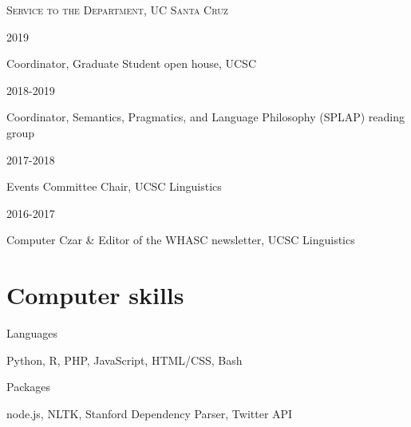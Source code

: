 \documentclass[12pt]{article} %
\begin{document}
\textsc{Service to the Department, UC Santa Cruz}\\



\vspace{0.05cm}

\begin{minipage}[t]{3cm}
2019
\end{minipage}
\begin{minipage}[t]{\smallertextwidth}Coordinator, Graduate Student open house, UCSC\end{minipage}

\begin{minipage}[t]{3cm}
2018-2019
\end{minipage}
\begin{minipage}[t]{\smallertextwidth}Coordinator, Semantics, Pragmatics, and Language Philosophy (SPLAP) reading group\end{minipage}

\vspace{0.05cm}

\begin{minipage}[t]{3cm}
2017-2018
\end{minipage}
\begin{minipage}[t]{\smallertextwidth}Events Committee Chair, UCSC Linguistics\end{minipage}

\begin{minipage}[t]{3cm}
2016-2017
\end{minipage}
\begin{minipage}[t]{\smallertextwidth}Computer Czar \& Editor of the WHASC newsletter, UCSC Linguistics\end{minipage}

\section{Computer skills}

\begin{minipage}[t]{3cm}
Languages
\end{minipage}
\begin{minipage}[t]{\smallertextwidth}Python, R, PHP, JavaScript, HTML/CSS, Bash\end{minipage}

\begin{minipage}[t]{3cm}
Packages
\end{minipage}
\begin{minipage}[t]{\smallertextwidth}node.js, NLTK, Stanford Dependency Parser, Twitter API\end{minipage}
\end{document}
